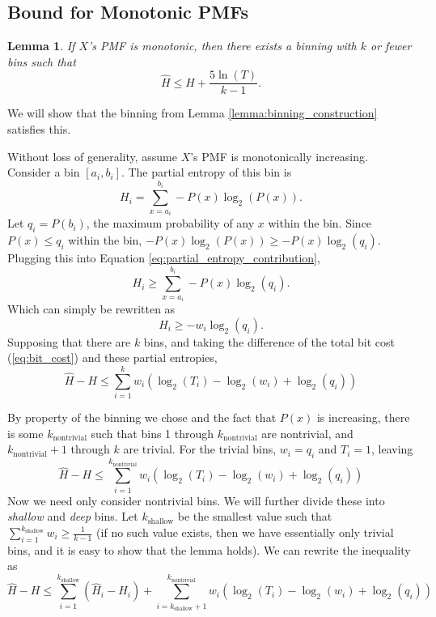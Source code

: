 \documentclass[letterpaper]{article}
\newtheorem{lemma}{Lemma}
\begin{document}
\subsection{Bound for Monotonic PMFs}

\begin{lemma}
  If $X$'s PMF is monotonic, then there exists a binning with $k$ or fewer bins such that
  \[\hat{H} \le H + \frac{5\ln(T)}{k-1}.\]
  \label{lemma:monotonic}
\end{lemma}

We will show that the binning from Lemma \ref{lemma:binning_construction} satisfies this.

Without loss of generality, assume $X$'s PMF is monotonically increasing.
Consider a bin $[a_i, b_i]$.
The partial entropy of this bin is
\begin{equation}
H_i = \sum_{x=a_i}^{b_i}-P(x)\log_2(P(x)).
\label{eq:partial_entropy_contribution}
\end{equation}
Let $q_i = P(b_i)$, the maximum probability of any $x$ within the bin.
Since $P(x) \le q_i$ within the bin, $-P(x)\log_2(P(x)) \ge -P(x)\log_2\left(q_i\right)$.
Plugging this into Equation \ref{eq:partial_entropy_contribution},
\[H_i \ge \sum_{x=a_i}^{b_i}-P(x)\log_2\left(q_i\right).\]
Which can simply be rewritten as
\[H_i \ge -w_i\log_2(q_i).\]
Supposing that there are $k$ bins, and taking the difference of the total bit cost (\ref{eq:bit_cost}) and these partial entropies,
\[\hat{H} - H \le \sum_{i=1}^k w_i\left(\log_2(T_i) - \log_2(w_i) + \log_2(q_i)\right)\]

By property of the binning we chose and the fact that $P(x)$ is increasing, there is some $k_\text{nontrivial}$ such that bins 1 through $k_\text{nontrivial}$ are nontrivial, and $k_\text{nontrivial} + 1$ through $k$ are trivial.
For the trivial bins, $w_i = q_i$ and $T_i = 1$, leaving
\[\hat{H} - H \le \sum_{i=1}^{k_\text{nontrivial}} w_i\left(\log_2(T_i) - \log_2(w_i) + \log_2(q_i)\right)\]
Now we need only consider nontrivial bins.
We will further divide these into \emph{shallow} and \emph{deep} bins.
Let $k_\text{shallow}$ be the smallest value such that $\sum_{i=1}^{k_\text{shallow}}w_i \ge \frac{1}{k-1}$ (if no such value exists, then we have essentially only trivial bins, and it is easy to show that the lemma holds).
We can rewrite the inequality as
\begin{equation}
\hat{H} - H \le \sum_{i=1}^{k_\text{shallow}} \left(\hat{H}_i - H_i\right) + \sum_{i=k_\text{shallow} + 1}^{k_\text{nontrivial}} w_i\left(\log_2(T_i) - \log_2(w_i) + \log_2(q_i)\right)
\label{eq:split_entropies}
\end{equation}
\end{document}

